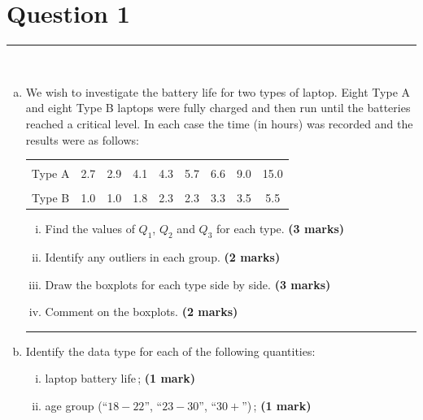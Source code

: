 \documentclass[12pt]{article}
\begin{document}
\section*{Question 1 }
\noindent\rule{\linewidth}{1pt}
\quad\\[-0.5cm]
\begin{enumerate}[a)]
\item We wish to investigate the battery life for two types of laptop. Eight Type A and eight Type B laptops were fully charged and then run until the batteries reached a critical level. In each case the time (in hours) was recorded and the results were as follows:\\[-0.6cm]
    \begin{center}
    \begin{tabular}{|c|cccccccc|}
    \hline
    &&&&&&&&\\[-0.3cm]
    Type A & 2.7 & 2.9 & 4.1 & 4.3 & 5.7 & 6.6 & 9.0 & 15.0  \\[0.1cm]
    \hline
    &&&&&&&&\\[-0.3cm]
    Type B & 1.0 & 1.0 & 1.8 & 2.3 & 2.3 & 3.3 & 3.5 & 5.5 \\[0.1cm]
    \hline
    \end{tabular}
    \end{center}
    \begin{enumerate}[i)]\itemsep0.3cm
    \item Find the values of $Q_1$, $Q_2$ and $Q_3$ for each type. \hfill{\scriptsize \bf (3 marks)}
    \item Identify any outliers in each group. \hfill{\scriptsize \bf (2 marks)}
    \item Draw the boxplots for each type side by side. \hfill{\scriptsize \bf (3 marks)}
    \item Comment on the boxplots. \hfill{\scriptsize \bf (2 marks)}
    \end{enumerate}
\begin{center}\noindent\rule{0.4\linewidth}{0.5pt}\end{center}
\item Identify the data type for each of the following quantities:
    \begin{enumerate}[i)]\itemsep0.3cm
    \item laptop battery life\,; \hfill{\scriptsize \bf (1 mark)}
    \item age group  (``$18-22$'', ``$23-30$'', ``$30+$'')\,; \hfill{\scriptsize \bf (1 mark)}

\end{enumerate}
\end{enumerate}
\end{document}

